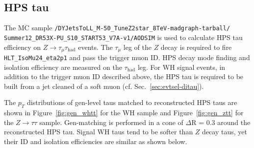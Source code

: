 \subsection{HPS tau\label{sec:HPS-id}}

The MC sample \texttt{/DYJetsToLL\_M-50\_TuneZ2star\_8TeV-madgraph-tarball/\\Summer12\_DR53X-PU\_S10\_START53\_V7A-v1/AODSIM} is used to calculate HPS tau efficiency on $Z\rightarrow\tau_{\mu}\tau_{\text{had}}$ events.  The $\tau_{\mu}$ leg of the $Z$ decay is required to fire \texttt{HLT\_IsoMu24\_eta2p1} and pass the trigger muon ID.  HPS decay mode finding and isolation efficiency are measured on the $\tau_{\text{had}}$ leg.  For WH signal events, in addition to the trigger muon ID described above, the HPS tau is required to be built from a jet cleaned of a soft muon (cf. Sec.~\ref{sec:evtsel-ditau}).

The $p_T$ distributions of gen-level taus matched to reconstructed HPS taus are shown in Figure~\ref{fig:gen_whtt} for the WH sample and Figure~\ref{fig:gen_ztt} for the $Z\rightarrow\tau\tau$ sample.  Gen-matching is performed in a cone of $\Delta$R = 0.3 around the reconstructed HPS tau.  Signal WH taus tend to be softer than $Z$ decay taus, yet their ID and isolation efficiencies are similar as shown below.

